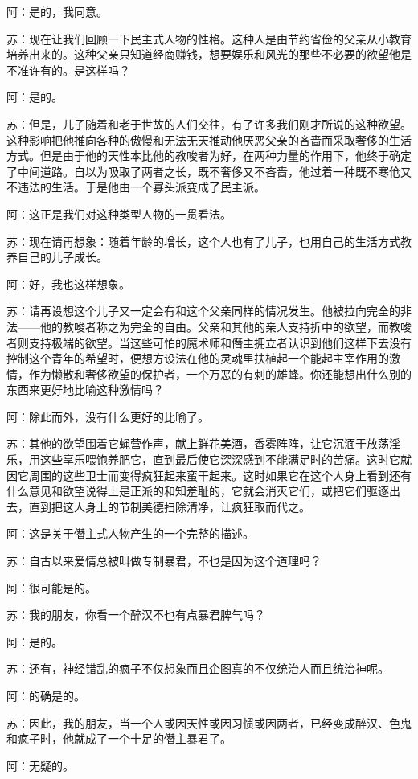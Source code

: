 \documentclass[12pt,oneside]{book}
\begin{document}
阿：是的，我同意。

苏：现在让我们回顾一下民主式人物的性格。这种人是由节约省俭的父亲从小教育培养出来的。这种父亲只知道经商赚钱，想要娱乐和风光的那些不必要的欲望他是不准许有的。是这样吗？

阿：是的。

苏：但是，儿子随着和老于世故的人们交往，有了许多我们刚才所说的这种欲望。这种影响把他推向各种的傲慢和无法无天推动他厌恶父亲的吝啬而采取奢侈的生活方式。但是由于他的天性本比他的教唆者为好，在两种力量的作用下，他终于确定了中间道路。自以为吸取了两者之长，既不奢侈又不吝啬，他过着一种既不寒伧又不违法的生活。于是他由一个寡头派变成了民主派。

阿：这正是我们对这种类型人物的一贯看法。

苏：现在请再想象：随着年龄的增长，这个人也有了儿子，也用自己的生活方式教养自己的儿子成长。

阿：好，我也这样想象。

苏：请再设想这个儿子又一定会有和这个父亲同样的情况发生。他被拉向完全的非法——他的教唆者称之为完全的自由。父亲和其他的亲人支持折中的欲望，而教唆者则支持极端的欲望。当这些可怕的魔术师和僭主拥立者认识到他们这样下去没有控制这个青年的希望时，便想方设法在他的灵魂里扶植起一个能起主宰作用的激情，作为懒散和奢侈欲望的保护者，一个万恶的有刺的雄蜂。你还能想出什么别的东西来更好地比喻这种激情吗？

阿：除此而外，没有什么更好的比喻了。

苏：其他的欲望围着它蝇营作声，献上鲜花美酒，香雾阵阵，让它沉湎于放荡淫乐，用这些享乐喂饱养肥它，直到最后使它深深感到不能满足时的苦痛。这时它就因它周围的这些卫士而变得疯狂起来蛮干起来。这时如果它在这个人身上看到还有什么意见和欲望说得上是正派的和知羞耻的，它就会消灭它们，或把它们驱逐出去，直到把这人身上的节制美德扫除清净，让疯狂取而代之。

阿：这是关于僭主式人物产生的一个完整的描述。

苏：自古以来爱情总被叫做专制暴君，不也是因为这个道理吗？

阿：很可能是的。

苏：我的朋友，你看一个醉汉不也有点暴君脾气吗？

阿：是的。

苏：还有，神经错乱的疯子不仅想象而且企图真的不仅统治人而且统治神呢。

阿：的确是的。

苏：因此，我的朋友，当一个人或因天性或因习惯或因两者，已经变成醉汉、色鬼和疯子时，他就成了一个十足的僭主暴君了。

阿：无疑的。
\end{document}
